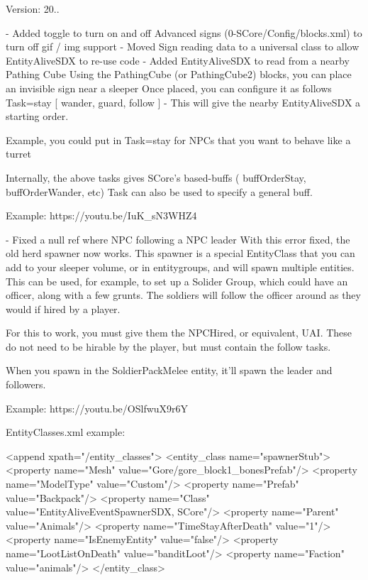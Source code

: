 Version\+: 20.. \begin{DoxyVerb}- Added toggle to turn on and off Advanced signs (0-SCore/Config/blocks.xml) to turn off gif / img support 
- Moved Sign reading data to a universal class to allow EntityAliveSDX to re-use code
- Added EntityAliveSDX to read from a nearby Pathing Cube
    Using the PathingCube (or PathingCube2) blocks, you can place an invisible sign near a sleeper
    Once placed, you can configure it as follows
        Task=stay  [ wander, guard, follow ] 
            - This will give the nearby EntityAliveSDX a starting order. 

            Example, you could put in Task=stay for NPCs that you want to behave like a turret

            Internally, the above tasks gives SCore's based-buffs  ( buffOrderStay, buffOrderWander, etc)
            Task can also be used to specify a general buff.

    Example: https://youtu.be/IuK_sN3WHZ4

- Fixed a null ref where NPC following a NPC leader
    With this error fixed, the old herd spawner now works. This spawner is a special EntityClass that you can add to your sleeper volume, or in entitygroups, and will spawn multiple entities.
    This can be used, for example, to set up a Solider Group, which could have an officer, along with a few grunts. The soldiers will follow the officer around as they would if hired by a player.

    For this to work, you must give them the NPCHired, or equivalent, UAI. These do not need to be hirable by the player, but must contain the follow tasks.

    When you spawn in the SoldierPackMelee entity, it'll spawn the leader and followers.

    Example: https://youtu.be/OSlfwuX9r6Y

    EntityClasses.xml example:

    <append xpath="/entity_classes">
        <entity_class name="spawnerStub">
            <property name="Mesh" value="Gore/gore_block1_bonesPrefab"/>
            <property name="ModelType" value="Custom"/>
            <property name="Prefab" value="Backpack"/>
            <property name="Class" value="EntityAliveEventSpawnerSDX, SCore"/>
            <property name="Parent" value="Animals"/>
            <property name="TimeStayAfterDeath" value="1"/>
            <property name="IsEnemyEntity" value="false"/>
            <property name="LootListOnDeath" value="banditLoot"/>
            <property name="Faction" value="animals"/>
        </entity_class>


\end{DoxyVerb}

